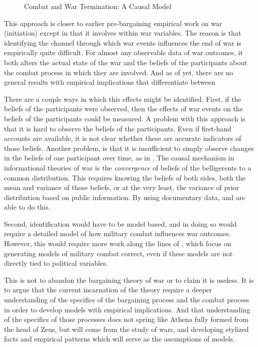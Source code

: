 \begin{figure}[htpb]
  \centering
  
  \caption{Combat and War Termination: A Causal Model}
  \label{bonds:fig:combat-causal-diagram}
\end{figure}

This approach is closer to earlier pre-bargaining empirical work on war (initiation) except in that it involves within war variables. %
The reason is that identifying the channel through which war events influences the end of war is empirically quite difficult. %
For almost any observable data of war outcomes, it both alters the actual state of the war and the beliefs of the participants about the combat process in which they are involved. %
And as of yet, there are no general results with empirical implications that differentiate between

There are a couple ways in which this effects might be identified. %
First, if the beliefs of the participants were observed, then the effects of war events on the beliefs of the participants could be measured. %
A problem with this approach is that it is hard to observe the beliefs of the participants.
Even if first-hand accounts are available, it is not clear whether these are accurate indicators of those beliefs. %
Another problem, is that it is insufficient to simply observe changes in the beliefs of one participant over time, as in \textcite{Reiter2009}. %
The causal mechanism in informational theories of war is the \textit{convergence} of beliefs of the belligerents to a common distribution. %
This requires knowing the beliefs of both sides, both the mean and variance of those beliefs, or at the very least, the variance of prior distribution based on public information. %
By using documentary data, \textcite{Goemans2000} and \textcite{Reiter2009} are able to do this.

Second, identification would have to be model based, and in doing so would require a detailed model of how military combat influences war outcomes.
However, this would require more work along the lines of \textcite{Biddle2004}, which focus on generating models of military combat correct, even if these models are not directly tied to political variables.

This is not to abandon the bargaining theory of war or to claim it is useless.
It is to argue that the current incarnation of the theory require a deeper understanding of the specifics of the bargaining process and the combat process in order to develop models with empirical implications.
And that understanding of the specifics of those processes does not spring like Athena fully formed from the head of Zeus, but will come from the study of wars, and developing stylized facts and empirical patterns which will serve as the assumptions of models.

